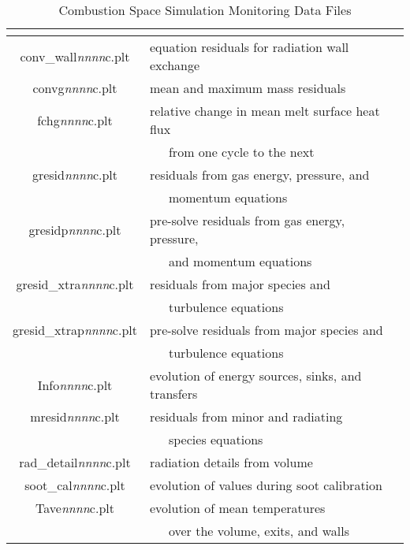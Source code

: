 \documentclass[twoside,12pt]{article}
\newcommand{\var}[1]{\text{\it #1}}
\numberwithin{equation}{section}
\begin{document}
 
\begin{table}[!hbp]
\caption{Combustion Space Simulation Monitoring Data Files}
\label{plt-files-comb}
\centering
\begin{tabular}{|c|l|}
\hline
\var{File Name } & \multicolumn{1}{|c|}{ \var{Explanation}} \\
\hline
conv\_wall\textit{nnnn}c.plt & equation residuals for radiation wall exchange \\
convg\textit{nnnn}c.plt  & mean and maximum mass residuals \\
fchg\textit{nnnn}c.plt  & relative change in mean melt surface heat flux \\
                        & ~~~from one cycle to the next \\
gresid\textit{nnnn}c.plt  & residuals from gas energy, pressure, and \\
                          & ~~~momentum equations \\
gresidp\textit{nnnn}c.plt  & pre-solve residuals from gas energy, pressure, \\
                           & ~~~and momentum equations \\
gresid\_xtra\textit{nnnn}c.plt  & residuals from major species and \\
                                & ~~~turbulence equations \\
gresid\_xtrap\textit{nnnn}c.plt  & pre-solve residuals from major species and \\
                                 & ~~~turbulence equations \\
Info\textit{nnnn}c.plt  & evolution of energy sources, sinks, and transfers \\
mresid\textit{nnnn}c.plt  & residuals from minor and radiating \\
                          & ~~~species equations \\
rad\_detail\textit{nnnn}c.plt  & radiation details from volume \\ 
soot\_cal\textit{nnnn}c.plt  & evolution of values during soot calibration \\
Tave\textit{nnnn}c.plt  & evolution of mean temperatures \\
                        & ~~~over the volume, exits, and walls \\
\hline
\end{tabular}
\end{table}
\end{document}
